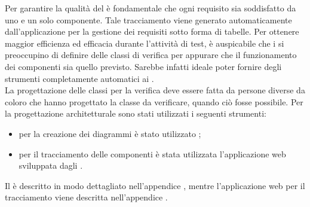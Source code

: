 Per garantire la qualità del  è fondamentale che ogni requisito sia soddisfatto da uno e un solo componente. Tale tracciamento viene generato automaticamente dall'applicazione per la gestione dei requisiti sotto forma di tabelle.
Per ottenere maggior efficienza ed efficacia durante l'attività di test, è auspicabile che i  si preoccupino di definire delle classi di verifica per appurare che il funzionamento dei componenti sia quello previsto. Sarebbe infatti ideale poter fornire degli strumenti completamente automatici ai .\\
La progettazione delle classi per la verifica deve essere fatta da persone diverse da coloro che hanno progettato la classe da verificare, quando ciò fosse possibile.
Per la progettazione architetturale sono stati utilizzati i seguenti strumenti:
\begin{itemize}
\item per la creazione dei diagrammi  è stato utilizzato ;
\item per il tracciamento delle componenti è stata utilizzata l'applicazione web sviluppata dagli .
\end{itemize}
Il   è descritto in modo dettagliato nell'appendice , mentre l'applicazione web per il tracciamento viene descritta nell'appendice .


